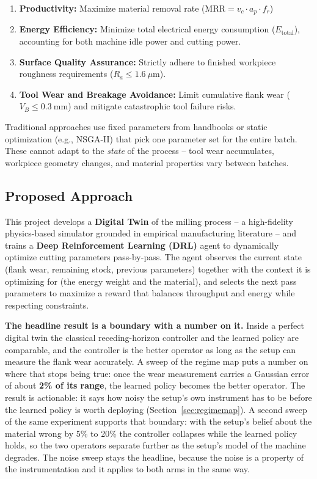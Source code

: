 \documentclass[11pt,a4paper]{article}
\newcommand{\alert}[1]{\textcolor{IITGold}{\textbf{#1}}}
\newcommand{\MRR}{\mathrm{MRR}}
\newcommand{\Ra}{R_a}
\newcommand{\VB}{V_B}
\begin{document}
\begin{enumerate}
    \item \textbf{Productivity:} Maximize material removal rate ($\MRR = v_c \cdot a_p \cdot f_r$)
    \item \textbf{Energy Efficiency:} Minimize total electrical energy consumption ($E_{\text{total}}$), accounting for both machine idle power and cutting power.
    \item \textbf{Surface Quality Assurance:} Strictly adhere to finished workpiece roughness requirements ($\Ra \le 1.6\ \mu\text{m}$).
    \item \textbf{Tool Wear and Breakage Avoidance:} Limit cumulative flank wear ($\VB \le 0.3\ \text{mm}$) and mitigate catastrophic tool failure risks.
\end{enumerate}

Traditional approaches use fixed parameters from handbooks or static optimization (e.g., NSGA-II) that pick one parameter set for the entire batch. These cannot adapt to the \textit{state} of the process -- tool wear accumulates, workpiece geometry changes, and material properties vary between batches.

\subsection{Proposed Approach}
This project develops a \textbf{Digital Twin} of the milling process -- a high-fidelity physics-based simulator grounded in empirical manufacturing literature -- and trains a \textbf{Deep Reinforcement Learning (DRL)} agent to dynamically optimize cutting parameters pass-by-pass. The agent observes the current state (flank wear, remaining stock, previous parameters) together with the context it is optimizing for (the energy weight and the material), and selects the next pass parameters to maximize a reward that balances throughput and energy while respecting constraints.

\textbf{The headline result is a boundary with a number on it.} Inside a perfect digital twin the classical receding-horizon controller and the learned policy are comparable, and the controller is the better operator as long as the setup can measure the flank wear accurately. A sweep of the regime map puts a number on where that stops being true: once the wear measurement carries a Gaussian error of about \alert{2\% of its range}, the learned policy becomes the better operator. The result is actionable: it says how noisy the setup's own instrument has to be before the learned policy is worth deploying (Section~\ref{sec:regimemap}). A second sweep of the same experiment supports that boundary: with the setup's belief about the material wrong by 5\% to 20\% the controller collapses while the learned policy holds, so the two operators separate further as the setup's model of the machine degrades. The noise sweep stays the headline, because the noise is a property of the instrumentation and it applies to both arms in the same way.
\end{document}
